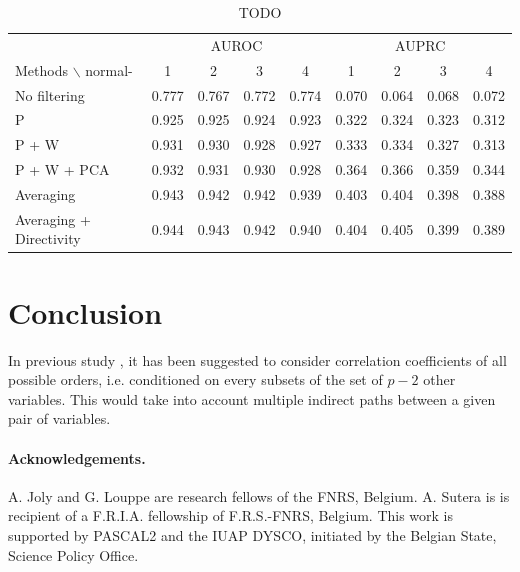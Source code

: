 \documentclass[wcp]{jmlr}
\begin{document}
\begin{table}[tbh]
\centering
\caption{TODO}
\begin{tabular}{@{}l *{8}{c}@{}}
\toprule
  & \multicolumn{4}{c}{AUROC} & \multicolumn{4}{c}{AUPRC} \\
\cmidrule(r){2-5}\cmidrule(r){6-9}
Methods $\backslash$ normal- & 1 & 2 & 3 & 4 & 1 & 2 & 3 & 4 \\
\midrule
No  filtering       & 0.777 & 0.767 & 0.772 & 0.774 & 0.070 & 0.064 & 0.068 & 0.072\\
P                   & 0.925 & 0.925 & 0.924 & 0.923 & 0.322 & 0.324 & 0.323 & 0.312\\
P + W               & 0.931 & 0.930 & 0.928 & 0.927 & 0.333 & 0.334 & 0.327 & 0.313\\
P + W + PCA         & 0.932 & 0.931 & 0.930 & 0.928 & 0.364 & 0.366 & 0.359 & 0.344\\
Averaging           & 0.943 & 0.942 & 0.942 & 0.939 & 0.403 & 0.404 & 0.398 & 0.388\\
Averaging + Directivity & 0.944 & 0.943 & 0.942 & 0.940 & 0.404 & 0.405 & 0.399 & 0.389\\
\bottomrule
\end{tabular}
\end{table}





\section{Conclusion}

In previous study \cite{shipley2002cause}, it has been suggested to
consider correlation coefficients of all possible orders,
i.e. conditioned on every subsets of the set of $p-2$ other variables. This
would take into account multiple indirect paths between a given pair of
variables.





\begin{scriptsize}

\paragraph{Acknowledgements.} A. Joly and G. Louppe are research fellows of
the FNRS, Belgium.  A. Sutera is  is recipient of
a F.R.I.A. fellowship of F.R.S.-FNRS, Belgium.
This work is supported by PASCAL2 and the IUAP DYSCO, initiated by the
Belgian State, Science Policy Office.

\end{scriptsize}
\end{document}
